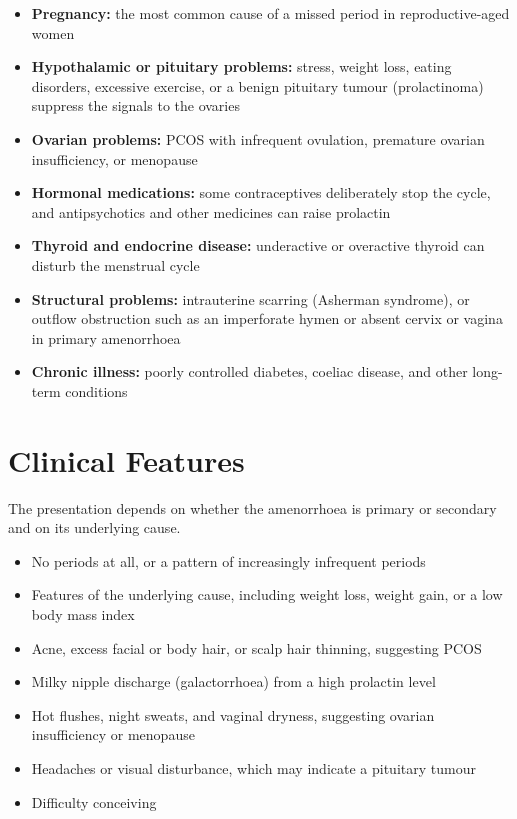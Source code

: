 \begin{itemize}
    \item \textbf{Pregnancy:} the most common cause of a missed period in reproductive-aged women
    \item \textbf{Hypothalamic or pituitary problems:} stress, weight loss, eating disorders, excessive exercise, or a benign pituitary tumour (prolactinoma) suppress the signals to the ovaries
    \item \textbf{Ovarian problems:} PCOS with infrequent ovulation, premature ovarian insufficiency, or menopause
    \item \textbf{Hormonal medications:} some contraceptives deliberately stop the cycle, and antipsychotics and other medicines can raise prolactin
    \item \textbf{Thyroid and endocrine disease:} underactive or overactive thyroid can disturb the menstrual cycle
    \item \textbf{Structural problems:} intrauterine scarring (Asherman syndrome), or outflow obstruction such as an imperforate hymen or absent cervix or vagina in primary amenorrhoea
    \item \textbf{Chronic illness:} poorly controlled diabetes, coeliac disease, and other long-term conditions
\end{itemize}

\section*{Clinical Features}
The presentation depends on whether the amenorrhoea is primary or secondary and on its underlying cause.

\begin{itemize}
    \item No periods at all, or a pattern of increasingly infrequent periods
    \item Features of the underlying cause, including weight loss, weight gain, or a low body mass index
    \item Acne, excess facial or body hair, or scalp hair thinning, suggesting PCOS
    \item Milky nipple discharge (galactorrhoea) from a high prolactin level
    \item Hot flushes, night sweats, and vaginal dryness, suggesting ovarian insufficiency or menopause
    \item Headaches or visual disturbance, which may indicate a pituitary tumour
    \item Difficulty conceiving
\end{itemize}

